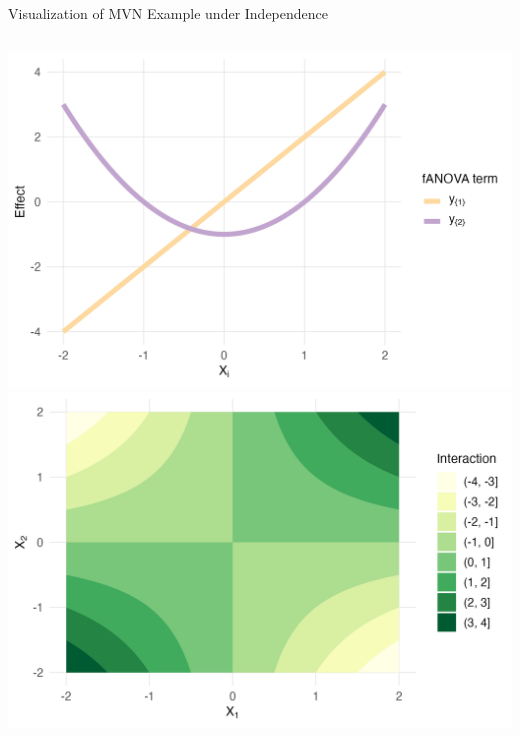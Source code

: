 \begin{frame}{Visualization of MVN Example under Independence}
  \begin{columns}
      \includegraphics[width=\linewidth]{../images/experiment_section/classical_ex_1_a1p20_a2p00_a11p00_a22p10_a12p10_rhop00_main.png}
      \includegraphics[width=\linewidth]{../images/experiment_section/classical_ex_1_a1p20_a2p00_a11p00_a22p10_a12p10_rhop00_interaction.png}
  \end{columns}
\end{frame}





